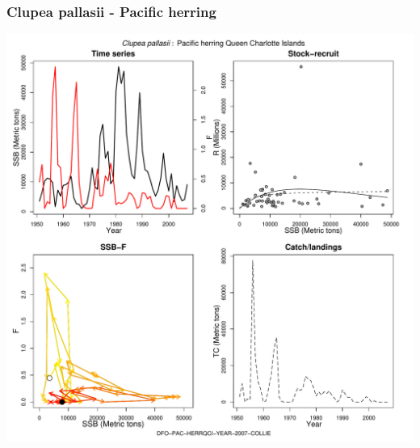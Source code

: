 \subsubsection{Clupea pallasii - Pacific herring}
\begin{center}
\includegraphics[width=1.2\textwidth]{../R/figures/DFO-PAC-HERRQCI-YEAR-2007-COLLIE.pdf}
\end{center}

